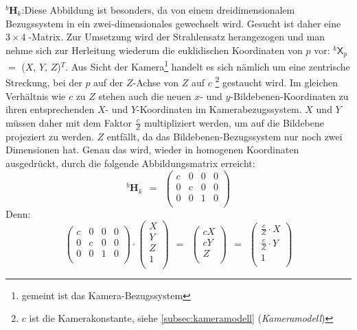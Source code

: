 \noindent$^b\boldsymbol{H}_k$:\quad Diese Abbildung ist besonders, da von einem dreidimensionalem Bezugssystem in ein zwei-dimensionales gewechselt wird. Gesucht ist daher eine $3{\times}4\;$-Matrix. Zur Umsetzung wird der Strahlensatz herangezogen und man nehme sich zur Herleitung wiederum die euklidischen Koordinaten von $p$ vor: $^k\mathsf{X}_p$ $=$ ($X$, $Y$, $Z$)$^T$. Aus Sicht der Kamera\footnote{gemeint ist das Kamera-Bezugssystem} handelt es sich nämlich um eine zentrische Streckung, bei der $p$ auf der $Z$-Achse von $Z$ auf $c$ \footnote{$c$ ist die Kamerakonstante, siehe \ref{subsec:kameramodell} (\emph{Kameramodell})} gestaucht wird. Im gleichen Verhältnis wie $c$ zu $Z$ stehen auch die neuen $x$- und $y$-Bildebenen-Koordinaten zu ihren entsprechenden $X$- und $Y$-Koordinaten im Kamerabezugssystem. $X$ und $Y$ müssen daher mit dem Faktor $\frac{c}{Z}$ multipliziert werden, um auf die Bildebene projeziert zu werden. $Z$ entfällt, da das Bildebenen-Bezugssystem nur noch zwei Dimensionen hat. Genau das wird, wieder in homogenen Koordinaten ausgedrückt, durch die folgende Abbildungsmatrix erreicht:
\begin{equation}
	^b\boldsymbol{H}_k {\:\:}={\:\:} \begin{pmatrix}c&0&0&0\\0&c&0&0\\0&0&1&0\\\end{pmatrix}
\end{equation}
Denn:
\begin{equation*}
	\begin{pmatrix}c&0&0&0\\0&c&0&0\\0&0&1&0\\\end{pmatrix} \cdot\begin{pmatrix}X\\Y\\Z\\1\\\end{pmatrix} {\:\:}={\:\:} \begin{pmatrix}cX\\cY\\Z\\\end{pmatrix} {\:\:}={\:\:} \begin{pmatrix}\frac{c}{Z}{\cdot}X\\\frac{c}{Z}{\cdot}Y\\1\\\end{pmatrix}
\end{equation*}\kleinerabstand

